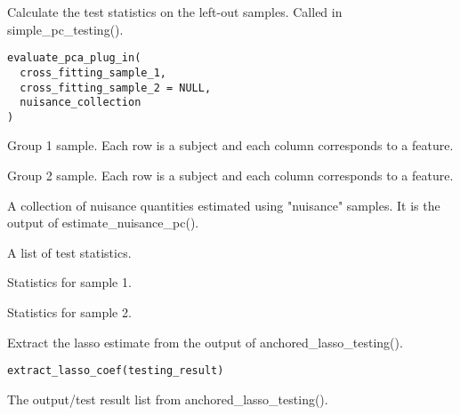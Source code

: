 \documentclass[a4paper]{book}
\begin{document}
%
\begin{Description}
Calculate the test statistics on the left-out samples. Called in simple\_pc\_testing().
\end{Description}
%
\begin{Usage}
\begin{verbatim}
evaluate_pca_plug_in(
  cross_fitting_sample_1,
  cross_fitting_sample_2 = NULL,
  nuisance_collection
)
\end{verbatim}
\end{Usage}
%
\begin{Arguments}
\begin{ldescription}
\item[\code{cross\_fitting\_sample\_1}] Group 1 sample. Each row is a subject and each column corresponds to a feature.

\item[\code{cross\_fitting\_sample\_2}] Group 2 sample. Each row is a subject and each column corresponds to a feature.

\item[\code{nuisance\_collection}] A collection of nuisance quantities estimated using "nuisance" samples. It is the output of estimate\_nuisance\_pc().
\end{ldescription}
\end{Arguments}
%
\begin{Value}
A list of test statistics.
\begin{ldescription}
\item[\code{influence\_each\_subject\_1}] Statistics for sample 1.
\item[\code{influence\_each\_subject\_2}] Statistics for sample 2.
\end{ldescription}
\end{Value}
%
\begin{Description}
Extract the lasso estimate from the output of anchored\_lasso\_testing().
\end{Description}
%
\begin{Usage}
\begin{verbatim}
extract_lasso_coef(testing_result)
\end{verbatim}
\end{Usage}
%
\begin{Arguments}
\begin{ldescription}
\item[\code{testing\_result}] The output/test result list from anchored\_lasso\_testing().
\end{ldescription}
\end{Arguments}
\end{document}
